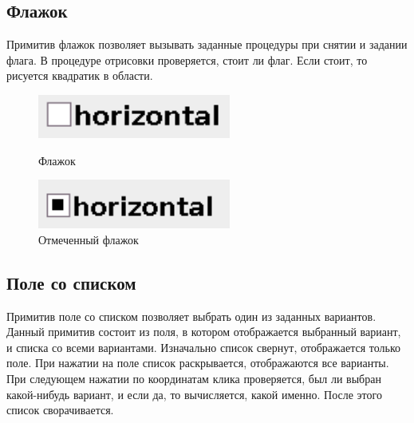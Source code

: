 \documentclass[14pt]{extarticle}
\begin{document}
	\subsection*{Флажок}
	Примитив флажок позволяет вызывать заданные процедуры при снятии и задании флага. В процедуре отрисовки проверяется, стоит ли флаг. Если стоит, то рисуется квадратик в области.
		\begin{figure}[h]
		\begin{center}
		\begin{minipage}[h]{0.4\linewidth}
		\includegraphics[width=180pt]{pictures/checkBox1.png}
		\caption{Флажок} %
		\label{ris:b1} %
		\end{minipage}
		\hfill 
		\begin{minipage}[h]{0.4\linewidth}
		\includegraphics[width=180pt]{pictures/checkBox2.png}
		\caption{Отмеченный флажок}
		\label{ris:b2}
		\end{minipage}
		\end{center}
		\end{figure}	
			
		
	\pagebreak		
	\subsection*{Поле со списком}
	Примитив поле со списком позволяет выбрать один из заданных вариантов. Данный примитив состоит из поля, в котором отображается выбранный вариант, и списка со всеми вариантами. Изначально список свернут, отображается только поле. При нажатии на поле список раскрывается, отображаются все варианты. При следующем нажатии по координатам клика проверяется, был ли выбран какой-нибудь вариант, и если да, то вычисляется, какой именно. После этого список сворачивается. 
	
\end{document}
